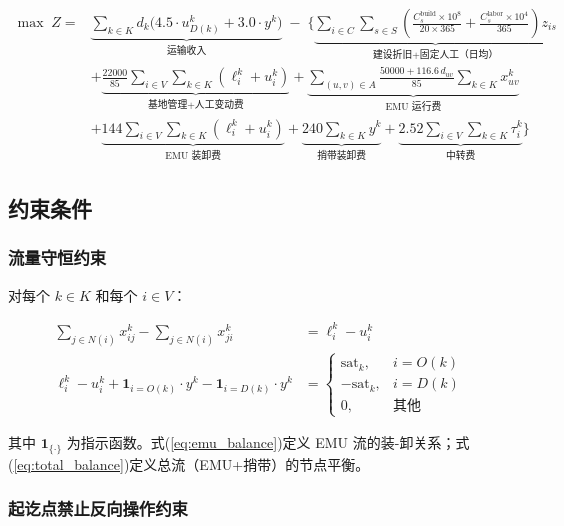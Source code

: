 \documentclass[12pt,a4paper,fontset=none]{ctexart}
\begin{document}
\begin{align}
\max\; Z = &\underbrace{\sum_{k\in K} d_k\Big(4.5 \cdot u_{D(k)}^k + 3.0 \cdot y^k\Big)}_{\text{运输收入}}\;-\;\Bigg\{
\underbrace{\sum_{i\in C}\sum_{s\in S}\left(\frac{C_s^{\text{build}}\times 10^8}{20\times 365} + \frac{C_s^{\text{labor}}\times 10^4}{365}\right)z_{is}}_{\text{建设折旧+固定人工（日均）}} \nonumber\\
&+\underbrace{\frac{22000}{85}\sum_{i\in V}\sum_{k\in K}(\ell_i^k+u_i^k)}_{\text{基地管理+人工变动费}}
+\underbrace{\sum_{(u,v)\in A}\frac{50000+116.6\,d_{uv}}{85}\sum_{k\in K}x_{uv}^k}_{\text{EMU 运行费}} \nonumber\\
&+\underbrace{144\sum_{i\in V}\sum_{k\in K}(\ell_i^k+u_i^k)}_{\text{EMU 装卸费}}
+\underbrace{240\sum_{k\in K}y^k}_{\text{捎带装卸费}}
+\underbrace{2.52\sum_{i\in V}\sum_{k\in K}\tau_i^k}_{\text{中转费}}
\Bigg\} \label{eq:obj}
\end{align}

\subsection{约束条件}

\subsubsection{流量守恒约束}

对每个 $k\in K$ 和每个 $i\in V$：

\begin{align}
\sum_{j\in N(i)} x_{ij}^k - \sum_{j\in N(i)} x_{ji}^k &= \ell_i^k - u_i^k \label{eq:emu_balance} \\[4pt]
\ell_i^k - u_i^k + \mathbf{1}_{i=O(k)}\cdot y^k - \mathbf{1}_{i=D(k)}\cdot y^k &=
\begin{cases}
\text{sat}_k, & i = O(k) \\
-\text{sat}_k, & i = D(k) \\
0, & \text{其他}
\end{cases} \label{eq:total_balance}
\end{align}

其中 $\mathbf{1}_{\{\cdot\}}$ 为指示函数。式(\ref{eq:emu_balance})定义 EMU 流的装-卸关系；式(\ref{eq:total_balance})定义总流（EMU+捎带）的节点平衡。

\subsubsection{起讫点禁止反向操作约束}
\end{document}
